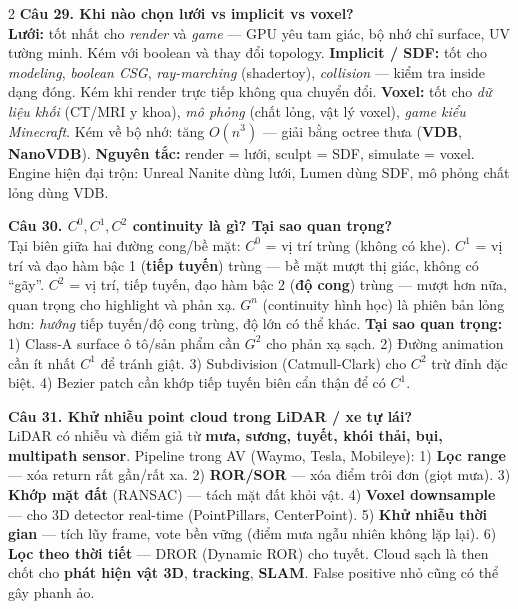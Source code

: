 \begin{paracol}{2}
\textbf{Câu 29. Khi nào chọn lưới vs implicit vs voxel?}\\
\textbf{Lưới:} tốt nhất cho \textit{render} và \textit{game} — GPU yêu tam giác, bộ nhớ chỉ surface, UV tường minh. Kém với boolean và thay đổi topology. \textbf{Implicit / SDF:} tốt cho \textit{modeling}, \textit{boolean CSG}, \textit{ray-marching} (shadertoy), \textit{collision} — kiểm tra inside dạng đóng. Kém khi render trực tiếp không qua chuyển đổi. \textbf{Voxel:} tốt cho \textit{dữ liệu khối} (CT/MRI y khoa), \textit{mô phỏng} (chất lỏng, vật lý voxel), \textit{game kiểu Minecraft}. Kém về bộ nhớ: tăng $O(n^3)$ — giải bằng octree thưa (\textbf{VDB}, \textbf{NanoVDB}). \textbf{Nguyên tắc:} render = lưới, sculpt = SDF, simulate = voxel. Engine hiện đại trộn: Unreal Nanite dùng lưới, Lumen dùng SDF, mô phỏng chất lỏng dùng VDB.

\textbf{Câu 30. $C^0,C^1,C^2$ continuity là gì? Tại sao quan trọng?}\\
Tại biên giữa hai đường cong/bề mặt: \textbf{$C^0$} = vị trí trùng (không có khe). \textbf{$C^1$} = vị trí và đạo hàm bậc 1 (\textbf{tiếp tuyến}) trùng — bề mặt mượt thị giác, không có ``gãy''. \textbf{$C^2$} = vị trí, tiếp tuyến, đạo hàm bậc 2 (\textbf{độ cong}) trùng — mượt hơn nữa, quan trọng cho highlight và phản xạ. \textbf{$G^n$} (continuity hình học) là phiên bản lỏng hơn: \textit{hướng} tiếp tuyến/độ cong trùng, độ lớn có thể khác. \textbf{Tại sao quan trọng:} 1) Class-A surface ô tô/sản phẩm cần $G^2$ cho phản xạ sạch. 2) Đường animation cần ít nhất $C^1$ để tránh giật. 3) Subdivision (Catmull-Clark) cho $C^2$ trừ đỉnh đặc biệt. 4) Bezier patch cần khớp tiếp tuyến biên cẩn thận để có $C^1$.

\textbf{Câu 31. Khử nhiễu point cloud trong LiDAR / xe tự lái?}\\
LiDAR có nhiễu và điểm giả từ \textbf{mưa, sương, tuyết, khói thải, bụi, multipath sensor}. Pipeline trong AV (Waymo, Tesla, Mobileye): 1) \textbf{Lọc range} — xóa return rất gần/rất xa. 2) \textbf{ROR/SOR} — xóa điểm trôi đơn (giọt mưa). 3) \textbf{Khớp mặt đất} (RANSAC) — tách mặt đất khỏi vật. 4) \textbf{Voxel downsample} — cho 3D detector real-time (PointPillars, CenterPoint). 5) \textbf{Khử nhiễu thời gian} — tích lũy frame, vote bền vững (điểm mưa ngẫu nhiên không lặp lại). 6) \textbf{Lọc theo thời tiết} — DROR (Dynamic ROR) cho tuyết. Cloud sạch là then chốt cho \textbf{phát hiện vật 3D}, \textbf{tracking}, \textbf{SLAM}. False positive nhỏ cũng có thể gây phanh ảo.


\end{paracol}
